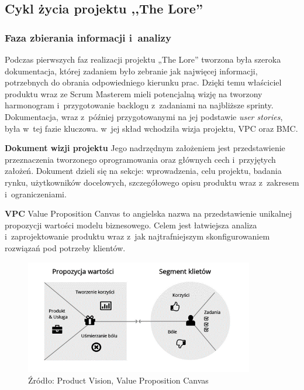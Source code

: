 \documentclass[oneside,polski,logo]{amuthesis}
\begin{document}
\subsection{Cykl życia projektu ,,The Lore''}

\subsubsection{Faza zbierania informacji i~analizy}

Podczas pierwszych faz realizacji projektu „The Lore” tworzona była szeroka dokumentacja, której zadaniem było zebranie jak najwięcej informacji, potrzebnych do obrania odpowiedniego kierunku prac. Dzięki temu właściciel produktu wraz ze Scrum Masterem mieli potencjalną wizję na tworzony harmonogram i~przygotowanie backlogu z~zadaniami na najbliższe sprinty. Dokumentacja, wraz z~później przygotowanymi na jej podstawie \emph{user stories}, była w~tej fazie kluczowa. w~jej skład wchodziła wizja projektu, VPC oraz BMC.

\textbf{Dokument wizji projektu}
Jego nadrzędnym założeniem jest przedstawienie przeznaczenia tworzonego oprogramowania oraz głównych cech i~przyjętych założeń. Dokument dzieli się na sekcje: wprowadzenia, celu projektu, badania rynku, użytkowników docelowych, szczegółowego opisu produktu wraz z~zakresem i~ograniczeniami.

\textbf{VPC}
Value Proposition Canvas to angielska nazwa na przedstawienie unikalnej propozycji wartości modelu biznesowego. Celem jest łatwiejsza analiza i~zaprojektowanie produktu wraz z~jak najtrafniejszym skonfigurowaniem rozwiązań pod potrzeby klientów. \cite{VPC}

\begin{figure}[h]
	\centering
	\includegraphics[width=10cm]{images/hyps/VPC.png}
	\caption{Źródło: Product Vision, Value Proposition Canvas}
\end{figure}
\end{document}
